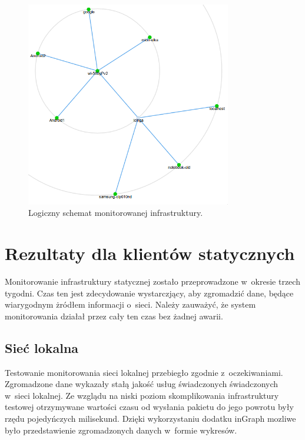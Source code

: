 \begin{figure}[ht]
  \caption{Logiczny schemat monitorowanej
    infrastruktury.}
  \label{fig:logicznySchematSieci}
  \centering
\includegraphics[width=0.8\textwidth]{img/logicznySchematSieci.png}
\end{figure}

\section[Klient statyczny][Rezultaty dla klientów statycznych]{Rezultaty dla klientów statycznych}

Monitorowanie infrastruktury statycznej zostało przeprowadzone
w~okresie trzech tygodni. Czas ten jest zdecydowanie wystarczjący, aby
zgromadzić dane, będące wiarygodnym żródłem informacji o~sieci. Należy
zauważyć, że system monitorowania działał przez cały ten czas bez
żadnej awarii.

\subsection[Sieć lokalna][Sieć lokalna]{Sieć lokalna}

Testowanie monitorowania sieci lokalnej przebiegło zgodnie
z~oczekiwaniami. Zgromadzone dane wykazały stałą jakość usług
świadczonych świadczonych w~sieci lokalnej. Ze wzglądu na niski poziom
skomplikowania infrastruktury testowej otrzymywane wartości czasu od
wysłania pakietu do jego powrotu były rzędu pojedyńczych
milisekund. Dzięki wykorzystaniu dodatku inGraph mozliwe było
przedstawienie zgromadzonych danych w~formie wykresów.

